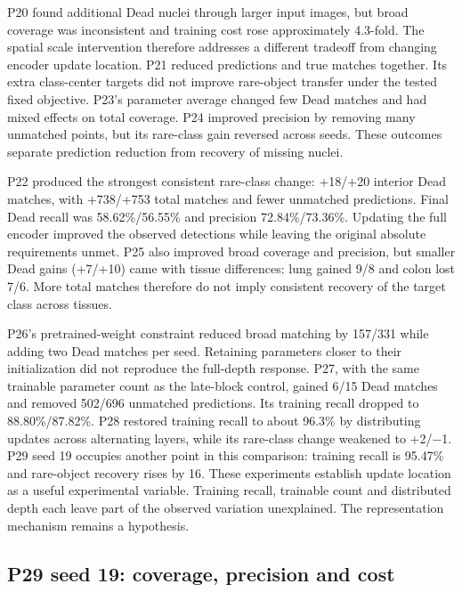 \documentclass[
  11pt,
]{article}
\begin{document}
P20 found additional Dead nuclei through larger input images, but broad
coverage was inconsistent and training cost rose approximately 4.3-fold.
The spatial scale intervention therefore addresses a different tradeoff
from changing encoder update location. P21 reduced predictions and true
matches together. Its extra class-center targets did not improve
rare-object transfer under the tested fixed objective. P23's parameter
average changed few Dead matches and had mixed effects on total
coverage. P24 improved precision by removing many unmatched points, but
its rare-class gain reversed across seeds. These outcomes separate
prediction reduction from recovery of missing nuclei.

P22 produced the strongest consistent rare-class change: +18/+20
interior Dead matches, with +738/+753 total matches and fewer unmatched
predictions. Final Dead recall was 58.62\%/56.55\% and precision
72.84\%/73.36\%. Updating the full encoder improved the observed
detections while leaving the original absolute requirements unmet. P25
also improved broad coverage and precision, but smaller Dead gains
(+7/+10) came with tissue differences: lung gained 9/8 and colon lost
7/6. More total matches therefore do not imply consistent recovery of
the target class across tissues.

P26's pretrained-weight constraint reduced broad matching by 157/331
while adding two Dead matches per seed. Retaining parameters closer to
their initialization did not reproduce the full-depth response. P27,
with the same trainable parameter count as the late-block control,
gained 6/15 Dead matches and removed 502/696 unmatched predictions. Its
training recall dropped to 88.80\%/87.82\%. P28 restored training recall
to about 96.3\% by distributing updates across alternating layers, while
its rare-class change weakened to +2/−1. P29 seed 19 occupies another
point in this comparison: training recall is 95.47\% and rare-object
recovery rises by 16. These experiments establish update location as a
useful experimental variable. Training recall, trainable count and
distributed depth each leave part of the observed variation unexplained.
The representation mechanism remains a hypothesis.

\subsection{P29 seed 19: coverage, precision and
cost}\label{p29-seed-19-coverage-precision-and-cost}
\end{document}
